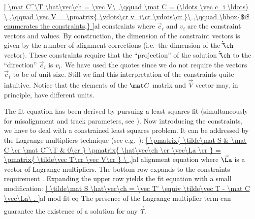 \eqref{
	\mat C^\T \hat\vec\ch = \vec V\ ,\qquad
	\mat C = (\ldots \vec c_i \ldots) \ ,\qquad
	\vec V = \pmatrix{
		\vdots\cr
		v_i\cr
		\vdots\cr
	}\ ,\qquad
	\hbox{$i$ enumerates the constraints,}
}{al constraints}
where $\vec c_i$ and $v_i$ are the constraint vectors and values. By construction, the dimension of the constraint vectors is given by the number of alignment corrections (i.e.~the dimension of the $\hat\vec\ch$ vector). These constraints require that the ``projection'' of the solution $\hat\vec\ch$ to the ``direction'' $\vec c_i$ is $v_i$. We have used the quotes since we do not require the vectors $\vec c_i$ to be of unit size. Still we find this interpretation of the constraints quite intuitive. Notice that the elements of the $\mat C$ matrix and $\vec V$ vector may, in principle, have different units.

The fit equation  has been derived by pursuing a least squares fit (simultaneously for misalignment and track parameters, see ). Now introducing the constraints, we have to deal with a constrained least squares problem. It can be addressed by the Lagrange-multipliers technique (see e.g.~):
\eqref{
	\pmatrix{
		\tilde\mat S & \mat C \cr
		\mat C^\T & 0\cr
	}
	\pmatrix{
		\hat\vec\ch \cr
		\vec\La \cr
	}
	=
	\pmatrix{
		\tilde\vec T\cr
		\vec V\cr
	}
\ ,}{al alignment equation}
where $\vec\La$ is a vector of Lagrange multipliers. The bottom row expands to the constraints requirement . Expanding the upper row yields the fit equation  with a small modification:
\eqref{
	\tilde\mat S \hat\vec\ch = \vec T' \equiv \tilde\vec T - \mat C \vec\La\ .
}{al mod fit eq}
The presence of the Lagrange multiplier term can guarantee the existence of a solution for any $\tilde\vec T$.

